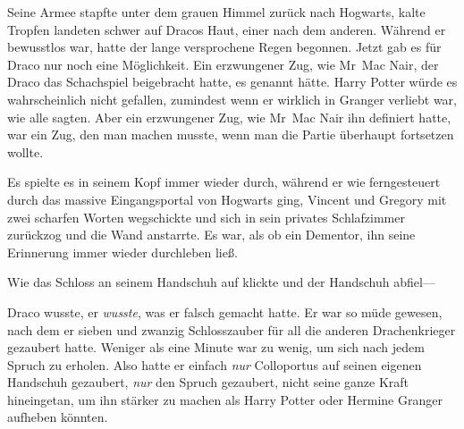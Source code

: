 Seine Armee stapfte unter dem grauen Himmel zurück nach Hogwarts, kalte Tropfen landeten schwer auf Dracos Haut, einer nach dem anderen. Während er bewusstlos war, hatte der lange versprochene Regen begonnen. Jetzt gab es für Draco nur noch eine Möglichkeit. Ein erzwungener Zug, wie Mr~Mac Nair, der Draco das Schachspiel beigebracht hatte, es genannt hätte. Harry Potter würde es wahrscheinlich nicht gefallen, zumindest wenn er wirklich in Granger verliebt war, wie alle sagten. Aber ein erzwungener Zug, wie Mr~Mac Nair ihn definiert hatte, war ein Zug, den man machen musste, wenn man die Partie überhaupt fortsetzen wollte.

Es spielte es in seinem Kopf immer wieder durch, während er wie ferngesteuert durch das massive Eingangsportal von Hogwarts ging, Vincent und Gregory mit zwei scharfen Worten wegschickte und sich in sein privates Schlafzimmer zurückzog und die Wand anstarrte. Es war, als ob ein Dementor, ihn seine Erinnerung immer wieder durchleben ließ.

Wie das Schloss an seinem Handschuh auf klickte und der Handschuh abfiel—

Draco wusste, er \emph{wusste}, was er falsch gemacht hatte. Er war so müde gewesen, nach dem er sieben und zwanzig Schlosszauber für all die anderen Drachenkrieger gezaubert hatte. Weniger als eine Minute war zu wenig, um sich nach jedem Spruch zu erholen. Also hatte er einfach \emph{nur} Colloportus auf seinen eigenen Handschuh gezaubert, \emph{nur} den Spruch gezaubert, nicht seine ganze Kraft hineingetan, um ihn stärker zu machen als Harry Potter oder Hermine Granger aufheben könnten.

